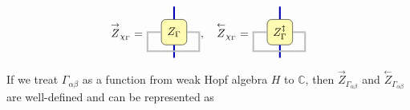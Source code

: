 \documentclass[a4paper,11pt]{article}
\theoremstyle{theorem}
\theoremstyle{remark}
\newcommand{\ZR}{\overset{\rightarrow}{Z}}
\newcommand{\ZL}{\overset{\leftarrow}{Z}}
\begin{document}
\begin{equation}
    \ZR_{\chi_{\Gamma}}=\begin{aligned}
      \begin{tikzpicture}
    \tikzstyle{tensor} = [draw=black, fill=yellow!30, rounded corners, minimum size=0.8cm]
    \tikzstyle{leg} = [line width=1.5pt]

    \node[tensor] (T) at (0,0) {$Z_{\Gamma}$};

    \draw[leg, color=blue!70!black] (T.north) -- ++(0,0.4);
    \draw[leg, color=blue!70!black] (T.south) -- ++(0,-0.4);

    \draw[leg, color=lightgray] (T.west) -- ++(-0.455,0);
    \draw[leg, color=lightgray] (T.east) -- ++(0.4,0);

    \draw[leg, color=lightgray] 
        (T.west) ++(-0.43,0) -- ++(0,-0.6) -- ++(1.63,0) -- ++(0,0.6) ;
\end{tikzpicture}
    \end{aligned},
    \quad 
    \ZL_{\chi_{\Gamma}}= 
    \begin{aligned}
        \begin{tikzpicture}
    \tikzstyle{tensor} = [draw=black, fill=yellow!30, rounded corners, minimum size=0.8cm]
    \tikzstyle{leg} = [line width=1.5pt]

    \node[tensor] (T) at (0,0) {$Z_{\Gamma}^{\ddagger}$};

    \draw[leg, color=blue!70!black] (T.north) -- ++(0,0.4);
    \draw[leg, color=blue!70!black] (T.south) -- ++(0,-0.4);

    \draw[leg, color=lightgray] (T.west) -- ++(-0.455,0);
    \draw[leg, color=lightgray] (T.east) -- ++(0.4,0);

    \draw[leg, color=lightgray] 
        (T.west) ++(-0.43,0) -- ++(0,-0.6) -- ++(1.63,0) -- ++(0,0.6) ;
\end{tikzpicture}
    \end{aligned}
\end{equation}
If we treat $\Gamma_{\alpha\beta}$ as a function from weak Hopf algebra $H$ to $\mathbb{C}$, then $\ZR_{\Gamma_{\alpha\beta}}$ and $\ZL_{\Gamma_{\alpha\beta}}$ are well-defined and can be represented as
\end{document}
